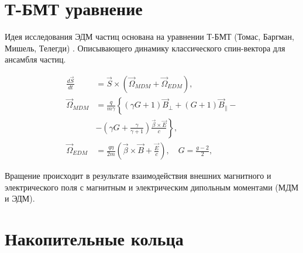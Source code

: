 \documentclass[final]{beamer}
\begin{document}
\begin{frame}[t]
\begin{multicols}{3}
\section{Т-БМТ уравнение}

Идея исследования ЭДМ частиц основана на уравнении Т-БМТ (Томас, Баргман, Мишель, Телегди) \cite{ref3}. Описывающего динамику классического спин-вектора для ансамбля частиц. 

\begin{equation}
\begin{aligned}
\frac{d \vec{S}}{d t} & =\vec{S} \times\left(\vec{\Omega}_{M D M}+\vec{\Omega}_{E D M}\right), \\
\vec{\Omega}_{M D M} & =\frac{q}{m \gamma}\left\{(\gamma G+1) \vec{B}_{\perp}+(G+1) \vec{B}_{\|}-\right. \\
& \left.-\left(\gamma G+\frac{\gamma}{\gamma+1}\right) \frac{\vec{\beta} \times \vec{E}}{c}\right\}, \\
\vec{\Omega}_{E D M} & =\frac{q \eta}{2 m}\left(\vec{\beta} \times \vec{B}+\frac{\vec{E}}{c}\right), \quad G=\frac{g-2}{2},
\end{aligned}
\end{equation}

Вращение происходит в результате взаимодействия внешних магнитного и электрического поля с магнитным и электрическим дипольным моментами (МДМ и ЭДМ).
\newline
\newline
\newline
\newline
\section{Накопительные кольца}


\end{multicols}
\end{frame}
\end{document}
